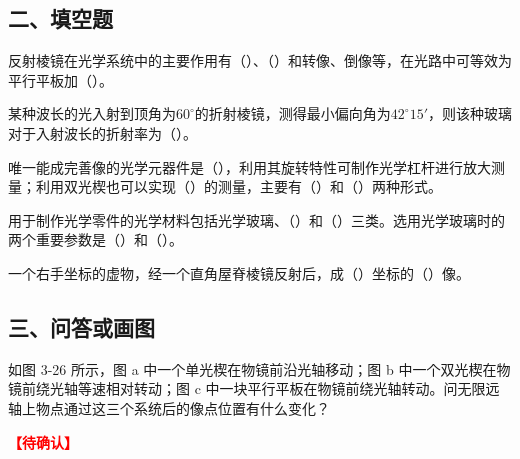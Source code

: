 \documentclass[standard, analysis, notocnum]{ExBook}
\newcommand{\answerarea}[1][8cm]{%
  \par\vspace{2mm}%
  \noindent{\color{themeColor!35}\rule{\linewidth}{0.4pt}}\par
  \noindent\begin{minipage}[t][#1][t]{\linewidth}\vspace{0pt}\end{minipage}\par
  \noindent{\color{themeColor!35}\rule{\linewidth}{0.4pt}}\par
}
\newcommand{\tbd}{\textcolor{red}{\textbf{【待确认】}}}
\begin{document}
\subsection{二、填空题}
\begin{qitems}
\begin{bbox}
\qitem 反射棱镜在光学系统中的主要作用有（\hspace{1.6em}）、（\hspace{1.6em}）和转像、倒像等，在光路中可等效为平行平板加（\hspace{1.6em}）。
\answerarea[3.5cm]
\end{bbox}
\begin{bbox}
\qitem 某种波长的光入射到顶角为$60^{\circ}$的折射棱镜，测得最小偏向角为$42^{\circ}15'$，则该种玻璃对于入射波长的折射率为（\hspace{1.6em}）。
\answerarea[3.5cm]
\end{bbox}
\begin{bbox}
\qitem 唯一能成完善像的光学元器件是（\hspace{1.6em}），利用其旋转特性可制作光学杠杆进行放大测量；利用双光楔也可以实现（\hspace{1.6em}）的测量，主要有（\hspace{1.6em}）和（\hspace{1.6em}）两种形式。
\answerarea[3.5cm]
\end{bbox}
\begin{bbox}
\qitem 用于制作光学零件的光学材料包括光学玻璃、（\hspace{1.6em}）和（\hspace{1.6em}）三类。选用光学玻璃时的两个重要参数是（\hspace{1.6em}）和（\hspace{1.6em}）。
\answerarea[3.5cm]
\end{bbox}
\begin{bbox}
\qitem 一个右手坐标的虚物，经一个直角屋脊棱镜反射后，成（\hspace{1.6em}）坐标的（\hspace{1.6em}）像。
\answerarea[3.5cm]
\end{bbox}
\end{qitems}

\subsection{三、问答或画图}
\begin{qitems}[startnum=1,suffix={*}]
\qitem[][.] 如图 3-26 所示，图 a 中一个单光楔在物镜前沿光轴移动；图 b 中一个双光楔在物镜前绕光轴等速相对转动；图 c 中一块平行平板在物镜前绕光轴转动。问无限远轴上物点通过这三个系统后的像点位置有什么变化？
\par\noindent\tbd
{}
\label{q:58:start}
\answerarea[8cm]
\label{q:58:end}
\end{qitems}
\end{document}
